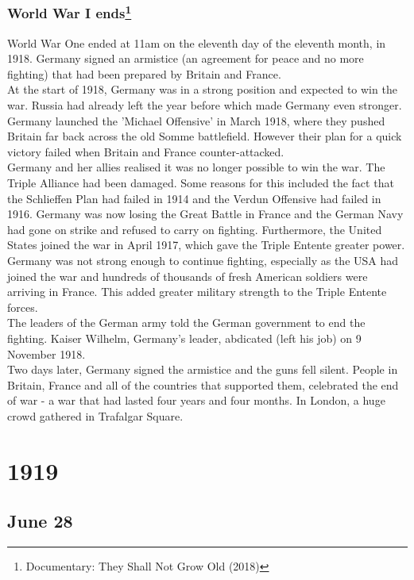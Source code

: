 \documentclass[11pt]{report}
\begin{document}
\subsection{World War I ends\protect\footnote{Documentary: They Shall Not Grow Old (2018)}}
World War One ended at 11am on the eleventh day of the eleventh month, in 1918. Germany signed an armistice (an agreement for peace and no more fighting) that had been prepared by Britain and France.\\
At the start of 1918, Germany was in a strong position and expected to win the war. Russia had already left the year before which made Germany even stronger.
Germany launched the 'Michael Offensive' in March 1918, where they pushed Britain far back across the old Somme battlefield. However their plan for a quick victory failed when Britain and France counter-attacked.\\
Germany and her allies realised it was no longer possible to win the war. The Triple Alliance had been damaged. Some reasons for this included the fact that the Schlieffen Plan had failed in 1914 and the Verdun Offensive had failed in 1916. Germany was now losing the Great Battle in France and the German Navy had gone on strike and refused to carry on fighting. Furthermore, the United States joined the war in April 1917, which gave the Triple Entente greater power.\\
Germany was not strong enough to continue fighting, especially as the USA had joined the war and hundreds of thousands of fresh American soldiers were arriving in France. This added greater military strength to the Triple Entente forces.\\
The leaders of the German army told the German government to end the fighting. Kaiser Wilhelm, Germany's leader, abdicated (left his job) on 9 November 1918.\\
Two days later, Germany signed the armistice and the guns fell silent. People in Britain, France and all of the countries that supported them, celebrated the end of war - a war that had lasted four years and four months. In London, a huge crowd gathered in Trafalgar Square.

\chapter{1919}
\section{June 28}
\end{document}
